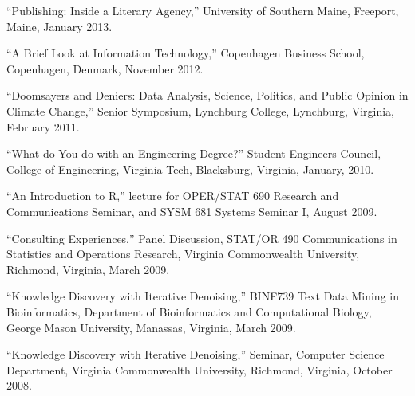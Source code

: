 \documentclass[11pt,article,oneside]{memoir}
\begin{document}






 
 \bigskip

\medskip

\ind “Publishing: Inside a Literary Agency,” University of Southern Maine, Freeport, Maine, January 2013.

\ind “A Brief Look at Information Technology,” Copenhagen Business School, Copenhagen, Denmark, November 2012.

\ind “Doomsayers and Deniers: Data Analysis, Science, Politics, and Public Opinion in Climate Change,” Senior Symposium, Lynchburg College, Lynchburg, Virginia, February 2011.

\ind “What do You do with an Engineering Degree?” Student Engineers Council, College of Engineering, Virginia Tech, Blacksburg, Virginia, January, 2010.

\ind “An Introduction to R,” lecture for OPER/STAT 690 Research and Communications Seminar, and SYSM 681 Systems Seminar I, August 2009.

\ind “Consulting Experiences,” Panel Discussion, STAT/OR 490 Communications in Statistics and Operations Research, Virginia Commonwealth University, Richmond, Virginia, March 2009.

\ind “Knowledge Discovery with Iterative Denoising,” BINF739 Text Data Mining in Bioinformatics, Department of Bioinformatics and Computational Biology, George Mason University, Manassas, Virginia, March 2009.

\ind “Knowledge Discovery with Iterative Denoising,” Seminar, Computer Science Department, Virginia Commonwealth University, Richmond, Virginia, October 2008.
\end{document}
